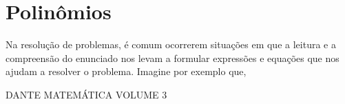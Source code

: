 \chapter{Polinômios}

Na resolução de problemas, é comum ocorrerem situações em que a leitura e a compreensão do enunciado nos levam a formular expressões e equações que nos ajudam a resolver o problema. Imagine por exemplo que, 

DANTE MATEMÁTICA VOLUME 3